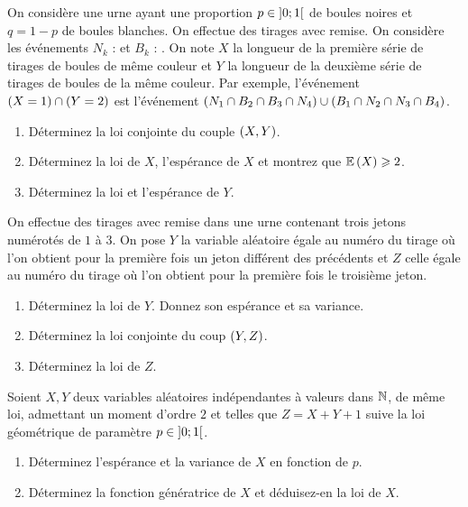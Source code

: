 \begin{exoss}
On considère une urne ayant une proportion \(p\in\left]0;1\right[\) de boules noires et \(q=1-p\) de boules blanches. On effectue des tirages avec remise. On considère les événements \(N_k\) :  et \(B_k\) : . On note \(X\) la longueur de la première série de tirages de boules de même couleur et \(Y\) la longueur de la deuxième série de tirages de boules de la même couleur. Par exemple, l'événement \(\left(X=1\right)\cap\left(Y=2\right)\) est l'événement \(\left(N_1\cap B_2\cap B_3\cap N_4\right)\cup\left(B_1\cap N_2\cap N_3\cap B_4\right)\).

\begin{enumerate}
    \item Déterminez la loi conjointe du couple \(\left(X,Y\right)\). \\
    \item Déterminez la loi de \(X\), l'espérance de \(X\) et montrez que \(\operatorname{\mathbb{E}}\left(X\right)\geqslant2\). \\
    \item Déterminez la loi et l'espérance de \(Y\).
\end{enumerate}
\end{exoss}

\begin{exoss}
On effectue des tirages avec remise dans une urne contenant trois jetons numérotés de \(1\) à \(3\). On pose \(Y\) la variable aléatoire égale au numéro du tirage où l'on obtient pour la première fois un jeton différent des précédents et \(Z\) celle égale au numéro du tirage où l'on obtient pour la première fois le troisième jeton.

\begin{enumerate}
    \item Déterminez la loi de \(Y\). Donnez son espérance et sa variance. \\
    \item Déterminez la loi conjointe du coup \(\left(Y,Z\right)\). \\
    \item Déterminez la loi de \(Z\).
\end{enumerate}
\end{exoss}

\begin{exoss}
Soient \(X,Y\) deux variables aléatoires indépendantes à valeurs dans \(\mathbb{N}\), de même loi, admettant un moment d'ordre \(2\) et telles que \(Z=X+Y+1\) suive la loi géométrique de paramètre \(p\in\left]0;1\right[\).

\begin{enumerate}
    \item Déterminez l'espérance et la variance de \(X\) en fonction de \(p\). \\
    \item Déterminez la fonction génératrice de \(X\) et déduisez-en la loi de \(X\).
\end{enumerate}
\end{exoss}

